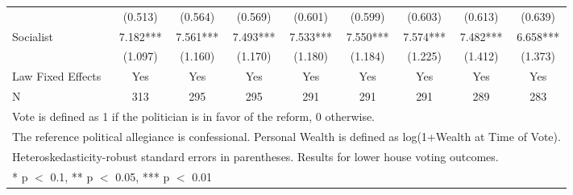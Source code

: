 \begin{table}
\begin{tabular}[t]{lcccccccc}
 & (\num{0.513}) & (\num{0.564}) & (\num{0.569}) & (\num{0.601}) & (\num{0.599}) & (\num{0.603}) & (\num{0.613}) & (\num{0.639})\\
Socialist & \num{7.182}*** & \num{7.561}*** & \num{7.493}*** & \num{7.533}*** & \num{7.550}*** & \num{7.574}*** & \num{7.482}*** & \num{6.658}***\\
 & (\num{1.097}) & (\num{1.160}) & (\num{1.170}) & (\num{1.180}) & (\num{1.184}) & (\num{1.225}) & (\num{1.412}) & (\num{1.373})\\
\midrule
Law Fixed Effects & Yes & Yes & Yes & Yes & Yes & Yes & Yes & Yes\\
N & \num{313} & \num{295} & \num{295} & \num{291} & \num{291} & \num{291} & \num{289} & \num{283}\\
\bottomrule
\multicolumn{9}{l}{\rule{0pt}{1em}Vote is defined as 1 if the politician is in favor of the reform, 0 otherwise.}\\
\multicolumn{9}{l}{\rule{0pt}{1em}The reference political allegiance is confessional. Personal Wealth is defined as log(1+Wealth at Time of Vote).}\\
\multicolumn{9}{l}{\rule{0pt}{1em}Heteroskedasticity-robust standard errors in parentheses. Results for lower house voting outcomes.}\\
\multicolumn{9}{l}{\rule{0pt}{1em}* p $<$ 0.1, ** p $<$ 0.05, *** p $<$ 0.01}\\
\end{tabular}
\end{table}
